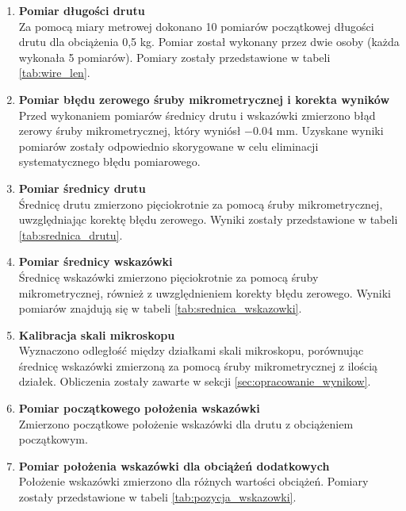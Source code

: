 \documentclass[a4paper,12pt]{article}
\begin{document}
\begin{enumerate}
    \item \textbf{Pomiar długości drutu} \\
    Za pomocą miary metrowej dokonano 10 pomiarów początkowej długości drutu dla obciążenia 0,5 kg. Pomiar został wykonany przez dwie osoby (każda wykonała 5 pomiarów). Pomiary zostały przedstawione w tabeli \ref{tab:wire_len}.
    
    \item \textbf{Pomiar błędu zerowego śruby mikrometrycznej i korekta wyników} \\
    Przed wykonaniem pomiarów średnicy drutu i wskazówki zmierzono błąd zerowy śruby mikrometrycznej, który wyniósł \(-0.04\) mm. Uzyskane wyniki pomiarów zostały odpowiednio skorygowane w celu eliminacji systematycznego błędu pomiarowego.
    
    \item \textbf{Pomiar średnicy drutu} \\
    Średnicę drutu zmierzono pięciokrotnie za pomocą śruby mikrometrycznej, uwzględniając korektę błędu zerowego. Wyniki zostały przedstawione w tabeli \ref{tab:srednica_drutu}.
    
    \item \textbf{Pomiar średnicy wskazówki} \\
    Średnicę wskazówki zmierzono pięciokrotnie za pomocą śruby mikrometrycznej, również z uwzględnieniem korekty błędu zerowego. Wyniki pomiarów znajdują się w tabeli \ref{tab:srednica_wskazowki}.
    
    \item \textbf{Kalibracja skali mikroskopu} \\
    Wyznaczono odległość między działkami skali mikroskopu, porównując średnicę wskazówki zmierzoną za pomocą śruby mikrometrycznej z ilością działek. Obliczenia zostały zawarte w sekcji \ref{sec:opracowanie_wynikow}.
    
    \item \textbf{Pomiar początkowego położenia wskazówki} \\
    Zmierzono początkowe położenie wskazówki dla drutu z obciążeniem początkowym.
    
    \item \textbf{Pomiar położenia wskazówki dla obciążeń dodatkowych} \\
    Położenie wskazówki zmierzono dla różnych wartości obciążeń. Pomiary zostały przedstawione w tabeli \ref{tab:pozycja_wskazowki}.
\end{enumerate}
\end{document}

